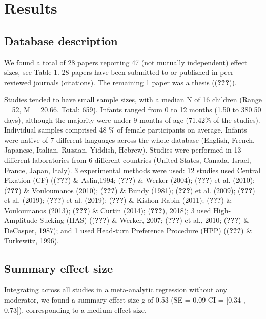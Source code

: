 \documentclass[man]{apa6}
\begin{document}
\section{Results}\label{results}

\subsection{Database description}\label{database-description}

We found a total of 28 papers reporting 47 (not mutually independent)
effect sizes, see Table 1. 28 papers have been submitted to or published
in peer-reviewed journals (citations). The remaining 1 paper was a
thesis (({\textbf{???}})).

Studies tended to have small sample sizes, with a median N of 16
children (Range = 52, M = 20.66, Total: 659). Infants ranged from 0 to
12 months (1.50 to 380.50 days), although the majority were under 9
months of age (71.42\% of the studies). Individual samples comprised 48
\% of female participants on average. Infants were native of 7 different
languages across the whole database (English, French, Japanese, Italian,
Russian, Yiddish, Hebrew). Studies were performed in 13 different
laboratories from 6 different countries (United States, Canada, Israel,
France, Japan, Italy). 3 experimental methods were used: 12 studies used
Central Fixation (CF) (({\textbf{???}}) \& Aslin,1994; ({\textbf{???}})
\& Werker (2004); ({\textbf{???}}) et al. (2010); ({\textbf{???}}) \&
Vouloumanos (2010); ({\textbf{???}}) \& Bundy (1981); ({\textbf{???}})
et al. (2009); ({\textbf{???}}) et al. (2019); ({\textbf{???}}) et al.
(2019); ({\textbf{???}}) \& Kishon-Rabin (2011); ({\textbf{???}}) \&
Vouloumanos (2013); ({\textbf{???}}) \& Curtin (2014); ({\textbf{???}}),
2018); 3 used High-Amplitude Sucking (HAS) (({\textbf{???}}) \& Werker,
2007; ({\textbf{???}}) et al., 2010; ({\textbf{???}}) \& DeCasper,
1987); and 1 used Head-turn Preference Procedure (HPP) (({\textbf{???}})
\& Turkewitz, 1996).

\subsection{Summary effect size}\label{summary-effect-size}

Integrating across all studies in a meta-analytic regression without any
moderator, we found a summary effect size g of 0.53 (SE = 0.09 CI =
{[}0.34 , 0.73{]}), corresponding to a medium effect size.
\end{document}
